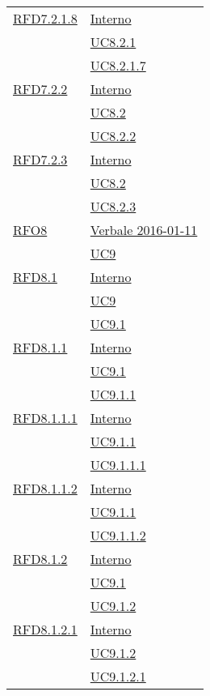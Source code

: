\begin{longtable}{|>{\centering}m{5cm}|m{5cm}<{\centering}|}
\hyperlink{RFD7.2.1.8}{RFD7.2.1.8} & \hyperlink{Interno}{Interno}\\
& \hyperref[UC8.2.1]{UC8.2.1}\\
& \hyperref[UC8.2.1.7]{UC8.2.1.7}\\ \hline

\hyperlink{RFD7.2.2}{RFD7.2.2} & \hyperlink{Interno}{Interno}\\
& \hyperref[UC8.2]{UC8.2}\\
& \hyperref[UC8.2.2]{UC8.2.2}\\ \hline

\hyperlink{RFD7.2.3}{RFD7.2.3} & \hyperlink{Interno}{Interno}\\
& \hyperref[UC8.2]{UC8.2}\\
& \hyperref[UC8.2.3]{UC8.2.3}\\ \hline

\hyperlink{RFO8}{RFO8} & \hyperlink{Verbale 2016-01-11}{Verbale 2016-01-11}\\
& \hyperref[UC9]{UC9}\\ \hline

\hyperlink{RFD8.1}{RFD8.1} & \hyperlink{Interno}{Interno}\\
& \hyperref[UC9]{UC9}\\
& \hyperref[UC9.1]{UC9.1}\\ \hline

\hyperlink{RFD8.1.1}{RFD8.1.1} & \hyperlink{Interno}{Interno}\\
& \hyperref[UC9.1]{UC9.1}\\
& \hyperref[UC9.1.1]{UC9.1.1}\\ \hline

\hyperlink{RFD8.1.1.1}{RFD8.1.1.1} & \hyperlink{Interno}{Interno}\\
& \hyperref[UC9.1.1]{UC9.1.1}\\
& \hyperref[UC9.1.1.1]{UC9.1.1.1}\\ \hline

\hyperlink{RFD8.1.1.2}{RFD8.1.1.2} & \hyperlink{Interno}{Interno}\\
& \hyperref[UC9.1.1]{UC9.1.1}\\
& \hyperref[UC9.1.1.2]{UC9.1.1.2}\\ \hline

\hyperlink{RFD8.1.2}{RFD8.1.2} & \hyperlink{Interno}{Interno}\\
& \hyperref[UC9.1]{UC9.1}\\
& \hyperref[UC9.1.2]{UC9.1.2}\\ \hline

\hyperlink{RFD8.1.2.1}{RFD8.1.2.1} & \hyperlink{Interno}{Interno}\\
& \hyperref[UC9.1.2]{UC9.1.2}\\
& \hyperref[UC9.1.2.1]{UC9.1.2.1}\\ \hline


\end{longtable}
